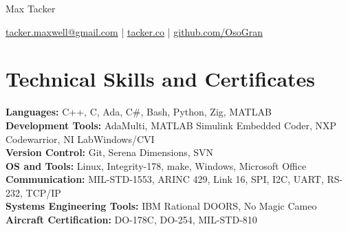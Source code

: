 \documentclass[11pt]{article}       %
\begin{document}
\centerline{\Huge Max Tacker}

\vspace{5pt}

\centerline{\href{mailto:tacker.maxwell@gmail.com}{tacker.maxwell@gmail.com} | \href{https://www.tacker.co/}{tacker.co} | \href{https://www.github.com/OsoGran}{github.com/OsoGran}}

\vspace{-10pt}

\section*{Technical Skills and Certificates}
\textbf{Languages:} C++, C, Ada, C\#, Bash, Python, Zig, MATLAB\\
\textbf{Development Tools:} AdaMulti, MATLAB Simulink Embedded Coder, NXP Codewarrior, NI LabWindows/CVI\\
\textbf{Version Control:} Git, Serena Dimensions, SVN\\
\textbf{OS and Tools:} Linux, Integrity-178, make, Windows, Microsoft Office \\
\textbf{Communication:} MIL-STD-1553, ARINC 429, Link 16, SPI, I2C, UART, RS-232, TCP/IP\\
\textbf{Systems Engineering Tools:} IBM Rational DOORS, No Magic Cameo\\
\textbf{Aircraft Certification:} DO-178C, DO-254, MIL-STD-810\\

\vspace{-6.5pt}

\end{document}
